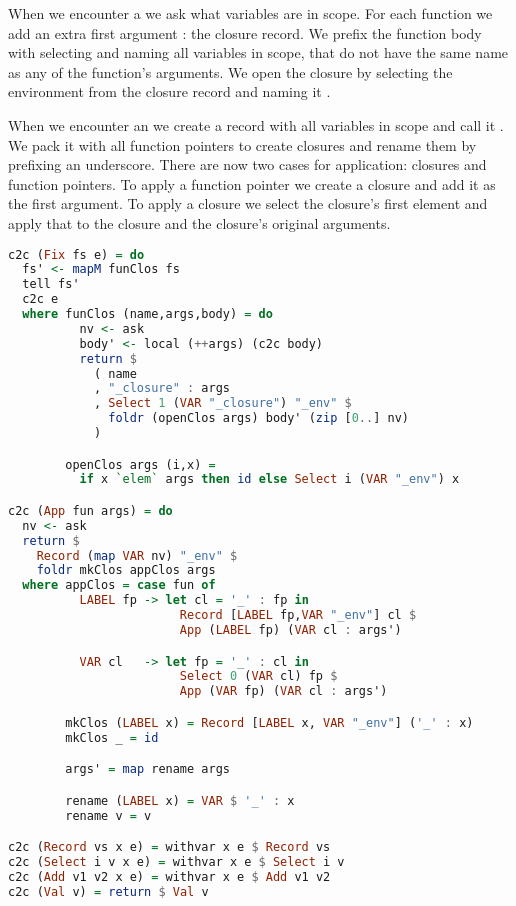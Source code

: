 {When we encounter a  we ask what variables are in scope. For each function we add an extra first argument : the closure record. We prefix the function body with selecting and naming all variables in scope, that do not have the same name as any of the function's arguments. We open the closure by selecting the environment from the closure record and naming it .

When we encounter an  we create a record with all variables in scope and call it . We pack it with all function pointers to create closures and rename them by prefixing an underscore. There are now two cases for application: closures and function pointers. To apply a function pointer we create a closure and add it as the first argument. To apply a closure we select the closure's first element and apply that to the closure and the closure's original arguments.

\begin{lstlisting}[language=Haskell]
c2c (Fix fs e) = do
  fs' <- mapM funClos fs
  tell fs'
  c2c e
  where funClos (name,args,body) = do
          nv <- ask
          body' <- local (++args) (c2c body)
          return $
            ( name
            , "_closure" : args
            , Select 1 (VAR "_closure") "_env" $
              foldr (openClos args) body' (zip [0..] nv)
            )

        openClos args (i,x) =
          if x `elem` args then id else Select i (VAR "_env") x

c2c (App fun args) = do
  nv <- ask
  return $
    Record (map VAR nv) "_env" $
    foldr mkClos appClos args
  where appClos = case fun of
          LABEL fp -> let cl = '_' : fp in
                        Record [LABEL fp,VAR "_env"] cl $
                        App (LABEL fp) (VAR cl : args')

          VAR cl   -> let fp = '_' : cl in
                        Select 0 (VAR cl) fp $
                        App (VAR fp) (VAR cl : args')

        mkClos (LABEL x) = Record [LABEL x, VAR "_env"] ('_' : x)
        mkClos _ = id

        args' = map rename args

        rename (LABEL x) = VAR $ '_' : x
        rename v = v

c2c (Record vs x e) = withvar x e $ Record vs
c2c (Select i v x e) = withvar x e $ Select i v
c2c (Add v1 v2 x e) = withvar x e $ Add v1 v2
c2c (Val v) = return $ Val v
\end{lstlisting}

}
